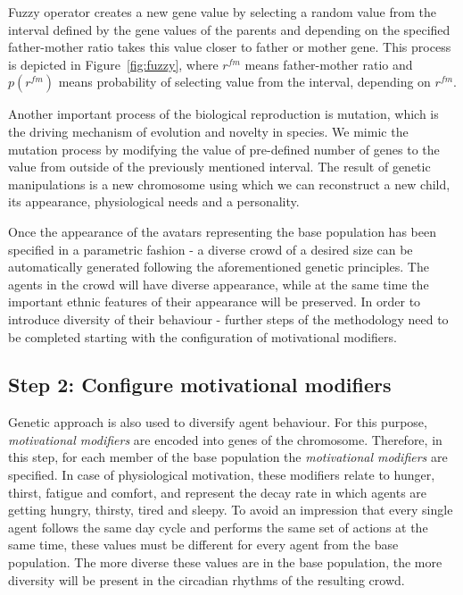 \documentclass[graybox]{svmult}
\begin{document}
Fuzzy operator creates a new gene value by selecting a random value from the interval defined by the gene values of the parents and depending on the specified father-mother ratio takes this value closer to father or mother gene. This process is depicted in Figure~\ref{fig:fuzzy}, where $r^{fm}$ means father-mother ratio and $p(r^{fm})$ means probability of selecting value from the interval, depending on $r^{fm}$. 

Another important process of the biological reproduction is mutation, which is the driving mechanism of evolution and novelty in species. We mimic the mutation process by modifying the value of pre-defined number of genes to the value from outside of the previously mentioned interval. The result of genetic manipulations is a new chromosome using which we can reconstruct a new child, its appearance, physiological needs and a personality.

Once the appearance of the avatars representing the base population has been specified in a parametric fashion - a diverse crowd of a desired size can be automatically generated following the aforementioned genetic principles. The agents in the crowd will have diverse appearance, while at the same time the important ethnic features of their appearance will be preserved. In order to introduce diversity of their behaviour - further steps of the methodology need to be completed starting with the configuration of motivational modifiers. 


\subsection{Step 2: Configure motivational modifiers}

\label{sec:step2}

Genetic approach is also used to diversify agent behaviour. For this purpose, \textit{motivational modifiers} are encoded into genes of the chromosome. Therefore, in this step,  for each member of the base population the \textit{motivational modifiers} are specified. In case of physiological motivation, these modifiers relate to hunger, thirst, fatigue and comfort, and represent the decay rate in which agents are getting hungry, thirsty, tired and sleepy. To avoid an impression that every single agent follows the same day cycle and performs the same set of actions at the same time, these values must be different for every agent from the base population. The more diverse these values are in the base population, the more diversity will be present in the circadian rhythms of the resulting crowd.
\end{document}

